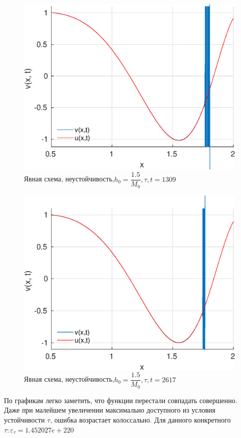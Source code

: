 \documentclass[12pt]{article}
\begin{document}
\begin{enumerate}
\begin{figure}[H]
\centerline{\includegraphics[scale = 0.7]{exp_d_t=1309.eps}}
\caption{Явная схема, неустойчивость,$h_0 = \dfrac{1.5}{M_0}, \tau, t = 1309$}
\end{figure} 

\begin{figure}[H]
\centerline{\includegraphics[scale = 0.7]{exp_d_t=2617.eps}}
\caption{Явная схема, неустойчивость,$h_0 = \dfrac{1.5}{M_0}, \tau, t = 2617$}
\end{figure} 

По графикам легко заметить, что функции перестали совпадать совершенно. Даже при малейшем  увеличении максимально доступного из условия устойчивости $\tau$, ошибка возрастает колоссально. Для данного конкретного $\tau: \varepsilon_{\tau} = 1.452027e+220$
 
\end{enumerate}
\end{document}
